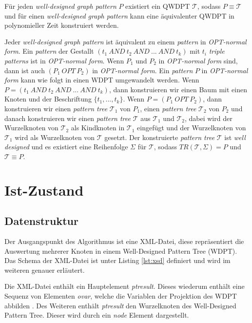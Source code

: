 \documentclass[draft,final]{vutinfth} %
\begin{document}
 Für jeden \textit{well-designed graph pattern} $P$ existiert ein QWDPT $\mathcal{T}$, sodass  $P \equiv \mathcal{T}$ und für einen \textit{well-designed graph pattern} kann eine äquivalenter QWDPT in polynomieller Zeit konstruiert werden.

Jeder \textit{well-designed graph pattern} ist äquivalent zu einem \textit{pattern} in \textit{OPT-normal form}. Ein \textit{pattern} der Gestallt $(t_1 \ AND \ t_2 \ AND \ ... \ AND \ t_k)$ mit $t_i$ \textit{triple patterns} ist in \textit{OPT-normal form}. Wenn $P_1$ und $P_2$ in \textit{OPT-normal form} sind, dann ist auch $(P_1 \ OPT \ P_2)$ in \textit{OPT-normal form}. Ein \textit{pattern} $P$ in \textit{OPT-normal form} kann wie folgt in einen WDPT umgewandelt werden. Wenn $P = (t_1 \ AND \ t_2 \ AND \ ... \ AND \ t_k)$, dann konstruieren wir einen Baum mit einen Knoten und der Beschriftung $\{ t_1, ..., t_k \}$. Wenn $P = (P_1 \ OPT \ P_2)$, dann konstruieren wir einen \textit{pattern tree} $\mathcal{T}_1$ von $P_1$, einen \textit{pattern tree} $\mathcal{T}_2$ von $P_2$ und danach konstruieren wir einen \textit{pattern tree} $\mathcal{T}$ aus $\mathcal{T}_1$ und $\mathcal{T}_2$, dabei wird der Wurzelknoten von $\mathcal{T}_2$ als Kindknoten in $\mathcal{T}_1$ eingefügt und der Wurzelknoten von $\mathcal{T}_1$ wird als Wurzelknoten von $\mathcal{T}$ gesetzt. Der konstruierte \textit{pattern tree} $\mathcal{T}$ ist \textit{well designed} und es existiert eine Reihenfolge $\Sigma$ für $\mathcal{T}$, sodass $TR(\mathcal{T},\Sigma) = P$ und $\mathcal{T} \equiv P$.

\cite{LPPS2013,PAG09}

\chapter{Ist-Zustand} \label{istZustand}
\section{Datenstruktur} \label{dataStruk}
Der Ausgangspunkt des Algorithmus ist eine XML-Datei, diese repräsentiert die Auswertung  mehrerer Knoten in einem Well-Designed Pattern Tree (WDPT). Das Schema der XML-Datei ist unter Listing \ref{lst:xsd} definiert und wird im weiteren genauer erläutert.

Die XML-Datei enthält ein Hauptelement \textit{ptresult}. Dieses wiederum enthält eine Sequenz von Elementen \textit{ovar}, welche die Variablen der Projektion des WDPT abbilden \cite{OptMat}. Des Weiteren enthält \textit{ptresult} den Wurzelknoten des Well-Designed Pattern Tree. Dieser wird durch ein \textit{node} Element dargestellt.
\end{document}
